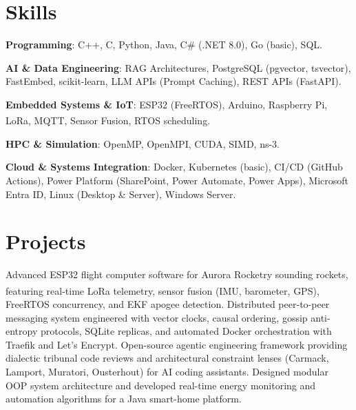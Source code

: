 \documentclass[letterpaper,11pt,english]{article}
\begin{document}
\section{Skills}
\resumeSubHeadingListStart
\item{
            \textbf{Programming}{: C++, C, Python, Java, C\# (.NET 8.0), Go (basic), SQL.}
            \hfill
      }
\item{
            \textbf{AI \& Data Engineering}{: RAG Architectures, PostgreSQL (pgvector, tsvector), FastEmbed, scikit-learn, LLM APIs (Prompt Caching), REST APIs (FastAPI).}
            \hfill
      }
\item{
            \textbf{Embedded Systems \& IoT}{: ESP32 (FreeRTOS), Arduino, Raspberry Pi, LoRa\textsuperscript{\textcopyright}, MQTT, Sensor Fusion, RTOS scheduling.}
            \hfill
      }
\item{
            \textbf{HPC \& Simulation}{: OpenMP, OpenMPI, CUDA, SIMD, ns-3.}
            \hfill
      }
\item{
            \textbf{Cloud \& Systems Integration}{: Docker, Kubernetes (basic), CI/CD (GitHub Actions), Power Platform (SharePoint, Power Automate, Power Apps), Microsoft Entra ID, Linux (Desktop \& Server), Windows Server.}
            \hfill
      }
\resumeSubHeadingListEnd

\section{Projects}
\resumeSubHeadingListStart
{}
{Advanced ESP32 flight computer software for Aurora Rocketry sounding rockets, featuring real-time LoRa\textsuperscript{\textcopyright} telemetry, sensor fusion (IMU, barometer, GPS), FreeRTOS concurrency, and EKF apogee detection.}
{Distributed peer-to-peer messaging system engineered with vector clocks, causal ordering, gossip anti-entropy protocols, SQLite replicas, and automated Docker orchestration with Traefik and Let's Encrypt.}
{Open-source agentic engineering framework providing dialectic tribunal code reviews and architectural constraint lenses (Carmack, Lamport, Muratori, Ousterhout) for AI coding assistants.}
{Designed modular OOP system architecture and developed real-time energy monitoring and automation algorithms for a Java smart-home platform.}
\resumeSubHeadingListEnd
\end{document}
